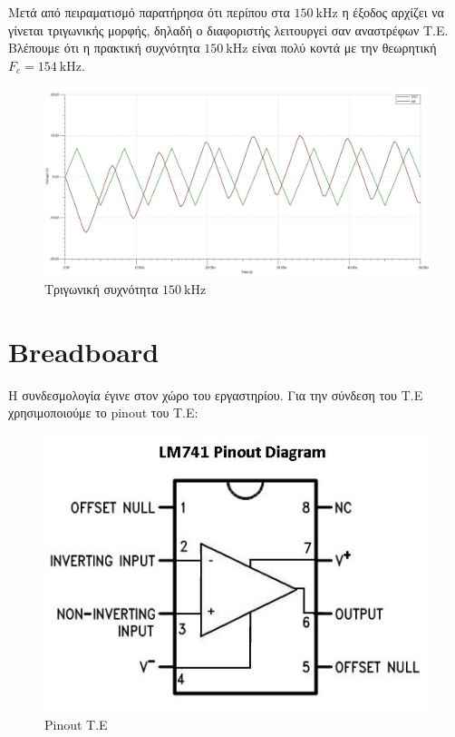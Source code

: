 \documentclass[12pt]{article}
\begin{document}
Μετά από πειραματισμό παρατήρησα ότι περίπου στα $\SI{150}{\kilo\hertz}$ η
έξοδος αρχίζει να γίνεται τριγωνικής μορφής, δηλαδή ο διαφοριστής λειτουργεί
σαν αναστρέφων Τ.Ε. Βλέπουμε ότι η πρακτική συχνότητα $\SI{150}{\kilo\hertz}$
είναι πολύ κοντά με την θεωρητική $F_c = \SI{154}{\kilo\hertz}$.

\begin{figure}[H]
	\centering
	\includegraphics[width=\linewidth]{./res/triang_150khz.jpg}
	\caption{Τριγωνική συχνότητα $\SI{150}{\kilo\hertz}$}
\end{figure}

\section{Breadboard}

Η συνδεσμολογία έγινε στον χώρο του εργαστηρίου. Για την σύνδεση του Τ.Ε
χρησιμοποιούμε το pinout του Τ.Ε:

\begin{figure}[H]
	\centering
	\includegraphics[width=\linewidth]{./res/opamp_pinout.jpg}
	\caption{Pinout Τ.Ε}
\end{figure}
\end{document}
